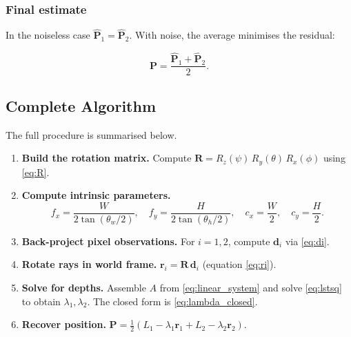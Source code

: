\documentclass[12pt, a4paper]{article}
\begin{document}
\subsubsection{Final estimate}
In the noiseless case $\hat{\mathbf{P}}_1 = \hat{\mathbf{P}}_2$. With noise,
the average minimises the residual:

\begin{equation}
\boxed{
\mathbf{P} = \frac{\hat{\mathbf{P}}_1 + \hat{\mathbf{P}}_2}{2}.
}
\end{equation}

\subsection{Complete Algorithm}

The full procedure is summarised below.

\begin{enumerate}
    \item \textbf{Build the rotation matrix.}
    Compute $\mathbf{R} = R_z(\psi)\,R_y(\theta)\,R_x(\phi)$
    using \eqref{eq:R}.

    \item \textbf{Compute intrinsic parameters.}
    \begin{equation*}
    f_x = \frac{W}{2\tan(\theta_w/2)},\quad
    f_y = \frac{H}{2\tan(\theta_h/2)},\quad
    c_x = \frac{W}{2},\quad c_y = \frac{H}{2}.
    \end{equation*}

    \item \textbf{Back-project pixel observations.}
    For $i = 1, 2$, compute $\mathbf{d}_i$ via \eqref{eq:di}.

    \item \textbf{Rotate rays in world frame.}
    $\mathbf{r}_i = \mathbf{R}\,\mathbf{d}_i$ (equation \eqref{eq:ri}).

    \item \textbf{Solve for depths.}
    Assemble $A$ from \eqref{eq:linear_system} and solve \eqref{eq:lstsq}
    to obtain $\lambda_1, \lambda_2$. The closed form is \eqref{eq:lambda_closed}.

    \item \textbf{Recover position.}
    $\mathbf{P} = \tfrac{1}{2}(L_1 - \lambda_1\mathbf{r}_1
                               + L_2 - \lambda_2\mathbf{r}_2)$.
\end{enumerate}

\end{document}

